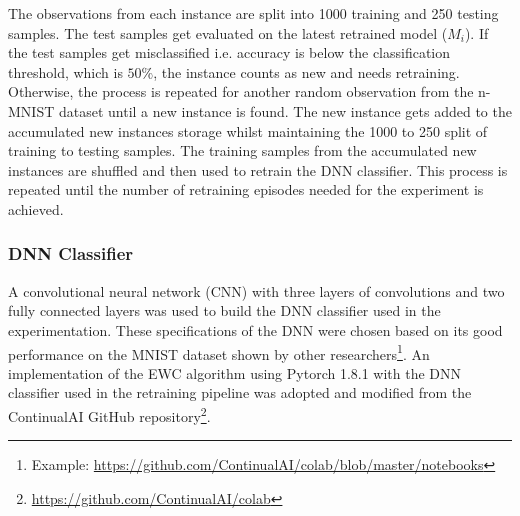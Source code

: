 The observations from each instance are split into 1000 training and 250 testing samples.
%
The test samples get evaluated on the latest retrained model ($M_i$).
%
If the test samples get misclassified i.e. accuracy is below the classification threshold, which is $50\%$, the instance counts as new and needs retraining. 
%
Otherwise, the process is repeated for another random observation from the n-MNIST dataset until a new instance is found.
%
The new instance gets added to the accumulated new instances storage whilst maintaining the 1000 to 250 split of training to testing samples. The training samples from the accumulated new instances are shuffled and then used to retrain the DNN classifier.
%
This process is repeated until the number of retraining episodes needed for the experiment is achieved.

\subsubsection{DNN Classifier}
A convolutional neural network (CNN) with three layers of convolutions and two fully connected layers was used to build the DNN classifier used in the experimentation. 
%
These specifications of the DNN were chosen based on its good performance on the MNIST dataset shown by other researchers\footnote{Example: \url{https://github.com/ContinualAI/colab/blob/master/notebooks}}.
%
An implementation of the EWC algorithm using Pytorch 1.8.1 with the DNN classifier used in the retraining pipeline was adopted and modified from the ContinualAI GitHub repository\footnote{\url{https://github.com/ContinualAI/colab}}.
%

